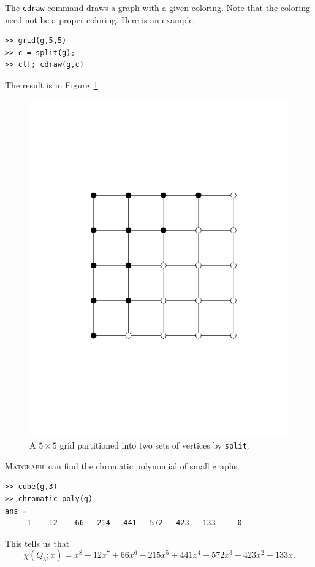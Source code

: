 \documentclass[12pt]{amsart}
\newcommand\matgraph{\textsc{Matgraph}}
\begin{document}
The \verb|cdraw| command draws a graph with a given coloring. Note
that the coloring need not be a proper coloring. Here is an example:
\begin{verbatim}
>> grid(g,5,5)
>> c = split(g);
>> clf; cdraw(g,c)
\end{verbatim}
The result is in Figure~\ref{fig:split-grid}.
\begin{figure}[ht]
  \begin{center}
    \includegraphics[scale=0.5]{figs/split-grid}
  \end{center}
  \caption{A $5\times5$ grid partitioned 
    into two sets of vertices by \texttt{split}.}
  \label{fig:split-grid}
\end{figure}

\matgraph\ can find the chromatic polynomial of small graphs.
\begin{verbatim}
>> cube(g,3)
>> chromatic_poly(g)
ans =
     1   -12    66  -214   441  -572   423  -133     0
\end{verbatim}
This tells us that
$$
\chi(Q_3;x) = x^8 -12 x^7 + 66 x^6 - 215 x^5 + 441 x^4 -572 x^3 +
423 x^2 -133 x .
$$
\end{document}
